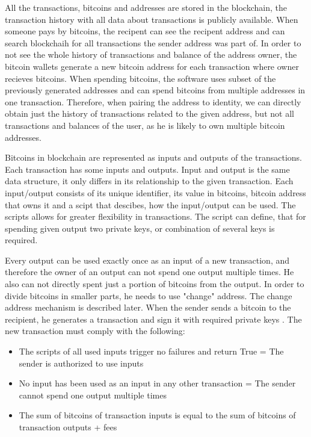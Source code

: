 \documentclass[
  digital, %
  table,   %
  lof,     %
  lot,     %
  oneside
]{fithesis3}
\begin{document}
All the transactions, bitcoins and addresses are stored in the blockchain,
the transaction history with all data about transactions is publicly available.
When someone pays by bitcoins, the recipent can see the recipent address
and can search blockchaih for all transactions the sender address was part of.
In order to not see the whole history of transactions and balance of the address owner,
the bitcoin wallets generate a new bitcoin address for each transaction where
owner recieves bitcoins.
When spending bitcoins, the software uses subset of the previously generated addresses and
can spend bitcoins from multiple addresses in one transaction.
Therefore, when pairing the address to identity,
we can directly obtain just the history of transactions related to the given
address, but not all transactions and balances of the user,
as he is likely to own multiple bitcoin addresses.

Bitcoins in blockchain are represented as inputs and outputs of the transactions.
Each transaction has some inputs and outputs. 
Input and output is the same data structure,
it only differs in its relationship to the given transaction.
Each input/output consists of its unique identifier, its value in bitcoins,
bitcoin address that owns it and a scipt that descibes, how the input/output can be used.
The scripts allows for greater flexibility in transactions. The script can define,
that for spending given output two private keys, or combination of several keys is required.

Every output can be used exactly once as an input of a new transaction,
and therefore the owner of an output can not
spend one output multiple times. He also can not directly
spent just a portion of bitcoins from the output. In order to divide bitcoins in smaller parts,
he needs to use "change" address. The change address mechanism is described later.
When the sender sends a bitcoin to the recipient, he generates a transaction
and sign it with required private keys .
The new transaction must comply with the following:

\begin{itemize}
  \item The scripts of all used inputs trigger no failures and return True = The sender is authorized to use inputs
  \item No input has been used as an input in any other transaction = The sender cannot spend one output multiple times
  \item The sum of bitcoins of transaction inputs is equal to the sum of bitcoins of transaction outputs + fees
\end{itemize}
\end{document}
